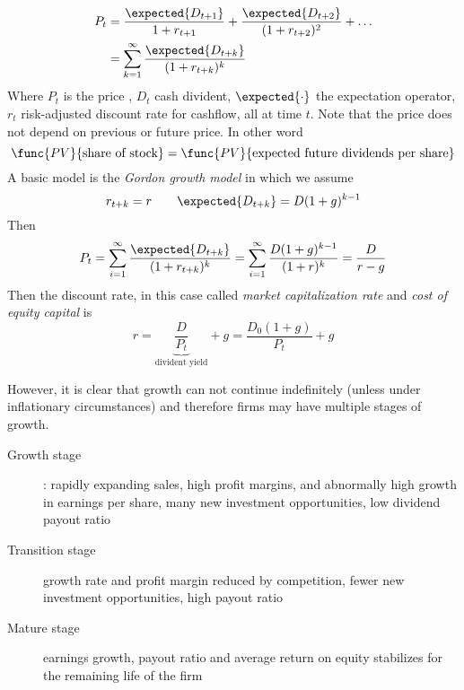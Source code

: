 \begin{align*}
    P_t &= \dfrac{\expected{D_{t+1}}}{1 + r_{t+1}}+ \dfrac{\expected{D_{t+2}}}{(1 + r_{t+2})^2} + \dots \\
    &= \sum_{k = 1}^{\infty} \dfrac{\expected{D_{t+k}}}{(1 + r_{t+k})^k}
\end{align*}
Where \(P_t\) is the price , \(D_t\) cash divident, \(\expected{\cdot}\) the expectation operator, \(r_t\) risk-adjusted discount rate for cashflow, all at time \(t\). Note that the price does not depend on previous or future price. In other word
\begin{equation*}
    \func{PV}{\text{share of stock}} = \func{PV}{\text{expected future dividends per share}}
\end{equation*}
A basic model is the \textit{Gordon growth model} in which we assume 
\begin{equation*}
    r_{t+k} = r \qquad \expected{D_{t+k}} = D (1 + g)^{k-1}
\end{equation*}
Then 
\begin{equation*}
    P_t = \sum_{i = 1}^{\infty} \dfrac{\expected{D_{t+k}}}{(1 + r_{t+k})^k} = \sum_{i = 1}^{\infty} \dfrac{D (1+g)^{k-1}}{(1 + r)^k} = \dfrac{D}{r - g}
\end{equation*}
Then the discount rate, in this case called \textit{market capitalization rate} and \textit{cost of equity capital} is 
\begin{equation*}
    r = \underbrace{\dfrac{D}{P_t}}_{\text{divident yield}} + g = \dfrac{D_0 (1 +g)}{P_t} + g
\end{equation*}

However, it is clear that growth can not continue indefinitely (unless under inflationary circumstances) and therefore firms may have multiple stages of growth. 
\begin{description}
    \item[Growth stage] : rapidly expanding sales, high profit margins, and 
    abnormally high growth in earnings per share, many new investment 
    opportunities, low dividend payout ratio
    \item[Transition stage] growth rate and profit margin reduced by 
    competition, fewer new investment opportunities, high payout ratio
    \item[Mature stage] earnings growth, payout ratio and average return on 
    equity stabilizes for the remaining life of the firm
\end{description}

